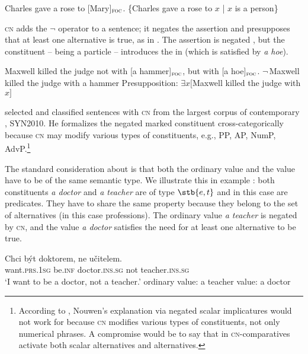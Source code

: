 \documentclass[output=paper, colorlinks, citecolor=brown, newtxmath]{langsci/langscibook}
\begin{document}
\ea \ea Charles gave a rose to [Mary]$_{\textsc{foc}}$.
	\ex \{Charles gave a rose to $x$ | $x$ is a person\}
    \label{ex:set}
\z
\z


\noindent \textsc{cn} adds the $\neg$ operator to a sentence; it negates the assertion and presupposes that at least one alternative is true, as in . The assertion is negated , but the constituent  -- being a  particle -- introduces the  in  (which is satisfied by \textit{a hoe}).

\ea  Maxwell killed the judge not with [a hammer]$_{\textsc{foc}}$, but with [a hoe]$_{\textsc{foc}}$. \label{ex:hammer} \ea $\neg\,$Maxwell killed the judge with a hammer \label{ex:negham}
\ex Presupposition: $\exists x[$Maxwell killed the judge with $x]$ \label{ex:presham}
\z
\z

\noindent \cite{dovcekal2017upper} selected and classified sentences with \textsc{cn} from the largest corpus of contemporary , SYN2010. He formalizes the negated  marked constituent cross-categorically because  \textsc{cn} may modify various types of constituents, e.g., PP, AP, NumP, AdvP.\footnote{\label{footn:expl}According to \cite{dovcekal2017upper}, Nouwen's explanation via negated scalar implicatures would not work for  because  \textsc{cn} modifies various types of constituents, not only numerical phrases. A compromise would be to say that in  \textsc{cn-}comparatives activate both scalar alternatives and  alternatives.}

The standard consideration about  is that both the ordinary value and the  value have to be of the same semantic type. We illustrate this in example : both constituents \textit{a doctor} and \textit{a teacher} are of type $\stb{e,t}$ and in this case are predicates. They have to share the same property because they belong to the set of alternatives (in this case professions). The ordinary value \textit{a teacher} is negated by \textsc{cn}, and the  value \textit{a doctor} satisfies the need for at least one alternative to be true.

\ea \label{ex:doktor} \gll Chci být doktorem, ne učitelem.\\
want.\textsc{prs.1sg} be.\textsc{inf} doctor.\textsc{ins.sg} not teacher.\textsc{ins.sg}\\
	\glt `I want to be a doctor, not a teacher.'
    \ea ordinary value: a teacher
    \ex {} value: a doctor
\z
\z
\end{document}
